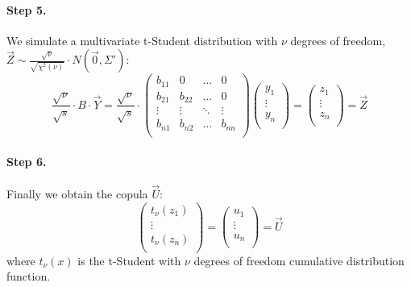 \documentclass[a4paper,12pt,final]{article}
\begin{document}
\paragraph{Step 5.} We simulate a multivariate t-Student distribution with $\nu$ degrees of freedom, 
$\vec{Z} \sim \frac{\sqrt{\nu}}{\sqrt{\chi^2(\nu)}} \cdot N(\vec{0}, \Sigma')$:
\begin{displaymath}
\frac{\sqrt{\nu}}{\sqrt{s}} \cdot B \cdot \vec{Y} 
=
\frac{\sqrt{\nu}}{\sqrt{s}} \cdot 
\left(
\begin{array}{cccc}
b_{11}   & 0        & \ldots & 0       \\
b_{21}   & b_{22}   & \ldots & 0       \\
\vdots  & \vdots  & \ddots & \vdots    \\
b_{n1}   & b_{n2}   & \ldots & b_{nn}  \\
\end{array}
\right)
\left(
\begin{array}{c}
y_1    \\
\vdots \\
y_n    \\
\end{array}
\right) 
=
\left(
\begin{array}{c}
z_1    \\
\vdots \\
z_n    \\
\end{array}
\right) 
= 
\vec{Z}
\end{displaymath}

\paragraph{Step 6.} Finally we obtain the copula $\vec{U}$:
\begin{displaymath}
\left(
\begin{array}{c}
t_\nu(z_1) \\
\vdots     \\
t_\nu(z_n) \\
\end{array}
\right) 
=
\left(
\begin{array}{c}
u_1    \\
\vdots \\
u_n    \\
\end{array}
\right) 
=
\vec{U} 
\end{displaymath}
where $t_\nu(x)$ is the t-Student with $\nu$ degrees of freedom cumulative distribution 
function.
\end{document}
